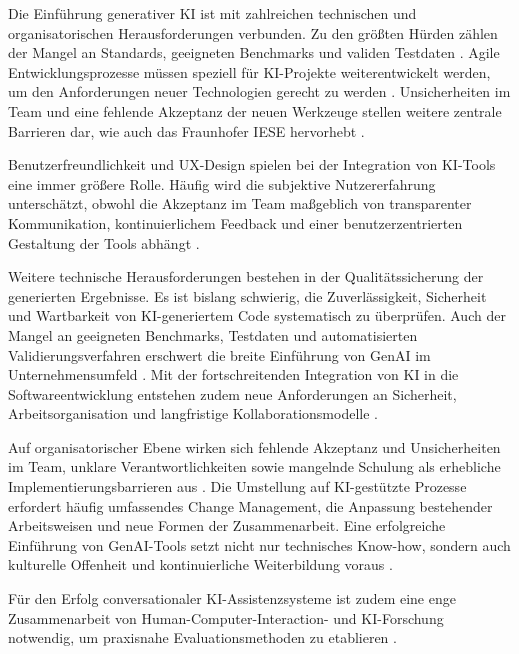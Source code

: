 
Die Einführung generativer KI ist mit zahlreichen technischen und
organisatorischen Herausforderungen verbunden. Zu den größten Hürden zählen der
Mangel an Standards, geeigneten Benchmarks und validen Testdaten
\cite{nguyen-duc_generative_2023}. Agile Entwicklungsprozesse müssen speziell
für KI-Projekte weiterentwickelt werden, um den Anforderungen neuer
Technologien gerecht zu werden \cite{gill_agile_2025}. Unsicherheiten im Team
und eine fehlende Akzeptanz der neuen Werkzeuge stellen weitere zentrale
Barrieren dar, wie auch das Fraunhofer IESE hervorhebt
\cite{siebert_generative_2024}.

Benutzerfreundlichkeit und UX-Design spielen bei der Integration von KI-Tools
eine immer größere Rolle. Häufig wird die subjektive Nutzererfahrung
unterschätzt, obwohl die Akzeptanz im Team maßgeblich von transparenter
Kommunikation, kontinuierlichem Feedback und einer benutzerzentrierten
Gestaltung der Tools abhängt \cite{sergeyuk_human-ai_2025, sifi_how_2025}.

Weitere technische Herausforderungen bestehen in der Qualitätssicherung der
generierten Ergebnisse. Es ist bislang schwierig, die Zuverlässigkeit,
Sicherheit und Wartbarkeit von KI-generiertem Code systematisch zu überprüfen.
Auch der Mangel an geeigneten Benchmarks, Testdaten und automatisierten
Validierungsverfahren erschwert die breite Einführung von GenAI im
Unternehmensumfeld \cite{nguyen-duc_generative_2023}. Mit der fortschreitenden
Integration von KI in die Softwareentwicklung entstehen zudem neue
Anforderungen an Sicherheit, Arbeitsorganisation und langfristige
Kollaborationsmodelle \cite{hazra_ai_2025}.

Auf organisatorischer Ebene wirken sich fehlende Akzeptanz und Unsicherheiten
im Team, unklare Verantwortlichkeiten sowie mangelnde Schulung als erhebliche
Implementierungsbarrieren aus \cite{nguyen-duc_generative_2023,
    schmitt_generative_2024}. Die Umstellung auf KI-gestützte Prozesse erfordert
häufig umfassendes Change Management, die Anpassung bestehender Arbeitsweisen
und neue Formen der Zusammenarbeit. Eine erfolgreiche Einführung von
GenAI-Tools setzt nicht nur technisches Know-how, sondern auch kulturelle
Offenheit und kontinuierliche Weiterbildung voraus
\cite{schmitt_generative_2024}.

Für den Erfolg conversationaler KI-Assistenzsysteme ist zudem eine enge
Zusammenarbeit von Human-Computer-Interaction- und KI-Forschung notwendig, um
praxisnahe Evaluationsmethoden zu etablieren \cite{richards_bridging_2025}.
